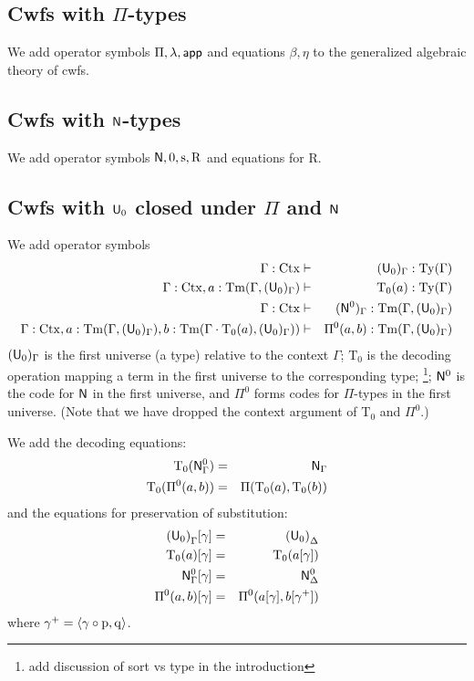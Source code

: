 \documentclass{lmcs}
\newcommand{\s}{\mathrm{s}}
\newcommand{\Rec}{\mathrm{R}}
\newcommand{\Ta}{\mathrm{T}}
\def\Ctx{\mathrm{Ctx}}
\begin{document}
\subsection{Cwfs with $\Pi$-types} 
We add operator symbols $\Pi, \lambda, \mathsf{app}$ and equations $\beta, \eta$ to the generalized algebraic theory of cwfs. 

\subsection{Cwfs with $\mathsf{N}$-types} 
We add operator symbols $\N, 0, \s, \Rec$ and equations for $\Rec$.

\subsection{Cwfs with $\mathsf{U}_0$ closed under $\Pi$ and $\mathsf{N}$} 
We add operator symbols
\begin{eqnarray*}
\Gamma : \Ctx &\vdash& (\U_0)_\Gamma : \Ty(\Gamma)\\
\Gamma : \Ctx, a : \Tm(\Gamma,(\U_0)_\Gamma) &\vdash& {\Ta_0}(a) : \Ty(\Gamma)\\
\Gamma : \Ctx &\vdash& (\N^0)_\Gamma : \Tm(\Gamma,(\U_0)_\Gamma) \\
\Gamma : \Ctx, 
a : \Tm(\Gamma,(\U_0)_\Gamma), 
b :  \Tm(\Gamma \cdot \Ta_0(a), (\U_0)_\Gamma))
&\vdash&
 \Pi^0(a,b) : \Tm(\Gamma,(\U_0)_\Gamma)
\end{eqnarray*}
$(\mathsf{U}_0)_\Gamma$ is the first universe (a type) relative to the context $\Gamma$; $\Ta_0$ is the decoding operation mapping a term in the first universe to the corresponding type; \footnote{add discussion of sort vs type in the introduction}; $\mathsf{N}^0$ is the code for $\mathsf{N}$ in the first universe, and $\Pi^0$ forms codes for $\Pi$-types in the first universe. (Note that we have dropped the context argument of $\Ta_0$ and $\Pi^0$.)

We add the decoding equations:
\begin{eqnarray*}
\Ta_0(\N^0_\Gamma) &=& \N_\Gamma\\
\Ta_0(\Pi^0(a,b)) &=& \Pi(\Ta_0(a),\Ta_0(b))
\end{eqnarray*}
and the equations for preservation of substitution:
\begin{eqnarray*}
{(\U_0)}_\Gamma [ \gamma ] &=& {(\U_0)}_\Delta\\
\Ta_0(a) [ \gamma ] &=& \Ta_0(a[ \gamma ] )\\
\N^0_\Gamma [ \gamma ] &=&\N^0_\Delta\\
\Pi^0(a,b)[ \gamma ] &=& \Pi^0(a [ \gamma ], b[ \gamma^+ ])
\end{eqnarray*}
where $\gamma^+ = \langle \gamma \circ \mathrm{p}, \mathrm{q} \rangle$.
\end{document}
